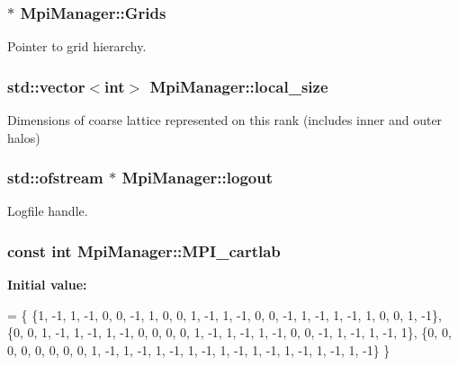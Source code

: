 \subsubsection[{\texorpdfstring{Grids}{Grids}}]{ $\ast$ Mpi\+Manager\+::\+Grids\hspace{0.3cm}{\ttfamily [static]}}\hypertarget{class_mpi_manager_a1520da6b8a663cba25a1a9822dd81543}{}\label{class_mpi_manager_a1520da6b8a663cba25a1a9822dd81543}


Pointer to grid hierarchy. 

\subsubsection[{\texorpdfstring{local\+\_\+size}{local_size}}]{\setlength{\rightskip}{0pt plus 5cm}std\+::vector$<$int$>$ Mpi\+Manager\+::local\+\_\+size}\hypertarget{class_mpi_manager_ad4a918a4cd19e644ff3295b2854fc6af}{}\label{class_mpi_manager_ad4a918a4cd19e644ff3295b2854fc6af}
Dimensions of coarse lattice represented on this rank (includes inner and outer halos) 
\subsubsection[{\texorpdfstring{logout}{logout}}]{\setlength{\rightskip}{0pt plus 5cm}std\+::ofstream $\ast$ Mpi\+Manager\+::logout\hspace{0.3cm}{\ttfamily [static]}}\hypertarget{class_mpi_manager_afbd3a2866235c1d4a32e6806318061fd}{}\label{class_mpi_manager_afbd3a2866235c1d4a32e6806318061fd}


Logfile handle. 

\subsubsection[{\texorpdfstring{M\+P\+I\+\_\+cartlab}{MPI_cartlab}}]{\setlength{\rightskip}{0pt plus 5cm}const int Mpi\+Manager\+::\+M\+P\+I\+\_\+cartlab\hspace{0.3cm}{\ttfamily [static]}}\hypertarget{class_mpi_manager_a2c3010f87e6a8a6c65e6f975e37fb7d5}{}\label{class_mpi_manager_a2c3010f87e6a8a6c65e6f975e37fb7d5}
{\bfseries Initial value\+:}
\begin{DoxyCode}
=
    \{
        \{1, -1,  1, -1,  0,  0, -1,  1,     0,  0,      1, -1,  1, -1,  0,  0, -1,  1, -1,  1, -1,  1,  0, 
       0,  1, -1\},
        \{0,  0,  1, -1,  1, -1,  1, -1,     0,  0,      0,  0,  1, -1,  1, -1,  1, -1,  0,  0, -1,  1, -1, 
       1, -1,  1\},
        \{0,  0,  0,  0,  0,  0,  0,  0,     1, -1,      1, -1,  1, -1,  1, -1,  1, -1,  1, -1,  1, -1,  1, 
      -1,  1, -1\}
    \}
\end{DoxyCode}



